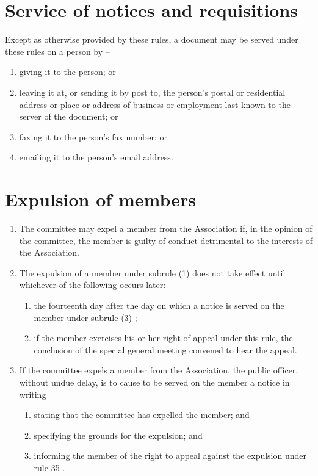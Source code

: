 \documentclass[a4paper,11pt]{article}
\begin{document}
\section{Service of notices and requisitions}
Except as otherwise provided by these rules, a document may be served under these rules on a person by --
\begin{enumerate}
	\item giving it to the person; or
	\item leaving it at, or sending it by post to, the person's postal or residential address or place or address of business or employment last known to the server of the document; or
	\item faxing it to the person's fax number; or
	\item emailing it to the person's email address.
\end{enumerate}

\section{Expulsion of members}
\begin{enumerate}
	\item The committee may expel a member from the Association if, in the opinion of the committee, the member is guilty of conduct detrimental to the interests of the Association.

	\item The expulsion of a member under subrule (1) does not take effect until whichever of the following occurs later:
		\begin{enumerate}
			\item the fourteenth day after the day on which a notice is served on the member under subrule (3) ;
			\item if the member exercises his or her right of appeal under this rule, the conclusion of the special general meeting convened to hear the appeal.
		\end{enumerate}
		
	\item If the committee expels a member from the Association, the public officer, without undue delay, is to cause to be served on the member a notice in writing
		\begin{enumerate}
			\item stating that the committee has expelled the member; and
			\item specifying the grounds for the expulsion; and
			\item informing the member of the right to appeal against the expulsion under rule 35 .
		\end{enumerate}
\end{enumerate}
\end{document}
